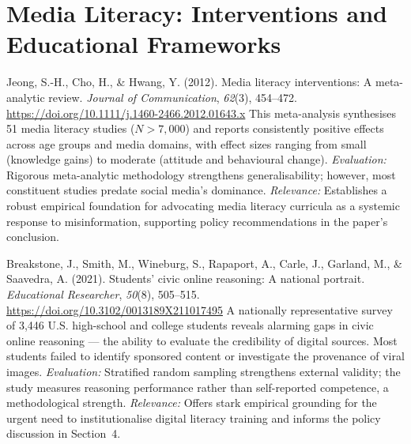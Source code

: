\section{Media Literacy: Interventions and Educational Frameworks}

\bibentry
  {Jeong, S.-H., Cho, H., \& Hwang, Y. (2012). Media literacy interventions: A meta-analytic
   review. \textit{Journal of Communication}, \textit{62}(3), 454–472.
   \href{https://doi.org/10.1111/j.1460-2466.2012.01643.x}{https://doi.org/10.1111/j.1460-2466.2012.01643.x}}
  {This meta-analysis synthesises 51 media literacy studies ($N > 7{,}000$) and reports
   consistently positive effects across age groups and media domains, with effect sizes ranging from
   small (knowledge gains) to moderate (attitude and behavioural change). \textit{Evaluation:}
   Rigorous meta-analytic methodology strengthens generalisability; however, most constituent
   studies predate social media's dominance. \textit{Relevance:} Establishes a robust empirical
   foundation for advocating media literacy curricula as a systemic response to misinformation,
   supporting policy recommendations in the paper's conclusion.}

\bibentry
  {Breakstone, J., Smith, M., Wineburg, S., Rapaport, A., Carle, J., Garland, M., \& Saavedra, A.
   (2021). Students' civic online reasoning: A national portrait.
   \textit{Educational Researcher}, \textit{50}(8), 505–515.
   \href{https://doi.org/10.3102/0013189X211017495}{https://doi.org/10.3102/0013189X211017495}}
  {A nationally representative survey of 3,446 U.S. high-school and college students reveals
   alarming gaps in civic online reasoning — the ability to evaluate the credibility of digital
   sources. Most students failed to identify sponsored content or investigate the provenance of
   viral images. \textit{Evaluation:} Stratified random sampling strengthens external validity;
   the study measures reasoning performance rather than self-reported competence, a methodological
   strength. \textit{Relevance:} Offers stark empirical grounding for the urgent need to
   institutionalise digital literacy training and informs the policy discussion in Section~4.}

